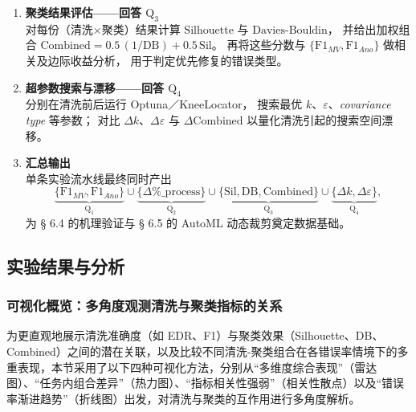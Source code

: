 \documentclass[10pt]{article} %
\numberwithin{equation}{section}
\begin{document}
\begin{enumerate}[label=\textbf{Step\,\arabic*.},itemindent=4em,leftmargin=0pt]
\item \textbf{聚类结果评估——回答 \(\mathrm{Q_3}\)}\\
      对每份（清洗×聚类）结果计算
      \(\mathrm{Silhouette}\) 与 \(\mathrm{Davies\text{-}Bouldin}\)，
      并给出加权组合
      \(\mathrm{Combined}=0.5\,(1/\mathrm{DB}) + 0.5\,\mathrm{Sil}\)。
      再将这些分数与
      \(\{\mathrm{F1}_{MV},\mathrm{F1}_{Ano}\}\) 做相关及边际收益分析，
      用于判定优先修复的错误类型。

\item \textbf{超参数搜索与漂移——回答 \(\mathrm{Q_4}\)}\\
      分别在清洗前后运行 Optuna／KneeLocator，
      搜索最优 \(k\)、\(\varepsilon\)、\textit{covariance type} 等参数；
      对比 \(\Delta k\)、\(\Delta\varepsilon\) 与
      \(\Delta\mathrm{Combined}\) 以量化清洗引起的搜索空间漂移。

\item \textbf{汇总输出}\\
      单条实验流水线最终同时产出  
      \[
        \underbrace{\bigl\{\mathrm{F1}_{MV},\mathrm{F1}_{Ano}\bigr\}}_{\mathrm{Q_1}}
        \cup
        \underbrace{\bigl\{\Delta\%\_{\text{process}}\bigr\}}_{\mathrm{Q_2}}
        \cup
        \underbrace{\bigl\{\mathrm{Sil},\mathrm{DB},\mathrm{Combined}\bigr\}}_{\mathrm{Q_3}}
        \cup
        \underbrace{\bigl\{\Delta k,\Delta\varepsilon\bigr\}}_{\mathrm{Q_4}},
      \]
      为 § 6.4 的机理验证与 § 6.5 的 AutoML 动态裁剪奠定数据基础。

\end{enumerate}

\subsection{实验结果与分析}
\label{sec:exp_results}

\subsubsection{可视化概览：多角度观测清洗与聚类指标的关系}
\label{subsec:viz_overview}

为更直观地展示清洗准确度（如 EDR、F1）与聚类效果（Silhouette、DB、Combined）之间的潜在关联，以及比较不同清洗-聚类组合在各错误率情境下的多重表现，本节采用了以下四种可视化方法，分别从“多维度综合表现”（雷达图）、“任务内组合差异”（热力图）、“指标相关性强弱”（相关性散点）以及“错误率渐进趋势”（折线图）出发，对清洗与聚类的互作用进行多角度解析。
\end{document}
